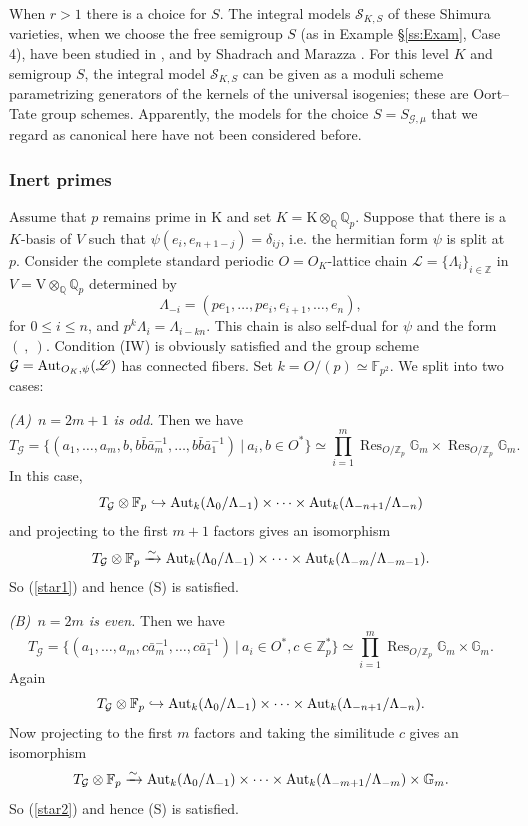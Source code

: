 \documentclass[reqno, 10pt]{amsart}
\newcommand{\BF}{\ensuremath{\mathbb {F}}\xspace}
\newcommand{\BG}{\ensuremath{\mathbb {G}}\xspace}
\newcommand{\BQ}{\ensuremath{\mathbb {Q}}\xspace}
\newcommand{\BZ}{\ensuremath{\mathbb {Z}}\xspace}
\newcommand{\CG}{\ensuremath{\mathcal {G}}\xspace}
\newcommand{\CS}{\ensuremath{\mathcal {S}}\xspace}
\newcommand{\RK}{\ensuremath{\mathrm {K}}\xspace}
\newcommand{\RV}{\ensuremath{\mathrm {V}}\xspace}
\DeclareMathOperator{\Res}{Res}
\theoremstyle{definition}
\numberwithin{equation}{subsection}
\numberwithin{subsubsection}{subsection}
\begin{document}
When $r>1$ there is a choice for $S$. The integral models $\CS_{K, S}$ of these Shimura varieties, when we choose the free semigroup $S$ (as in Example \S\ref{ss:Exam}, Case 4), have been studied  in \cite{HR}, \cite{HLS} and by  Shadrach \cite{Shadrach} and Marazza \cite{Marazza}. For this level $K$ and semigroup $S$, the integral model $\CS_{K, S}$ can be given 
as a moduli scheme parametrizing generators of the kernels of the universal isogenies; these are Oort--Tate group schemes. 
Apparently, the models for the choice $S=S_{\CG,\mu}$ that we regard as canonical here have not been considered before.

 
\subsubsection{Inert primes} Assume that $p$ remains prime in $\RK$ and set $K=\RK\otimes_\BQ\BQ_p$. Suppose that there is a $K$-basis of $V$ such that $\psi(e_i, e_{n+1-j})=\delta_{ij}$, i.e. the hermitian form $\psi$ is split at $p$. Consider the
complete standard periodic $O=O_K$-lattice chain $\mathscr L=\{\Lambda_i\}_{i\in \BZ}$ in $V=\RV\otimes_\BQ\BQ_p$ determined by
\[
\Lambda_{-i}=(pe_1,\ldots, pe_i, e_{i+1},\ldots ,e_n),
\]
for $0\leq i\leq n$, and $p^k\Lambda_i=\Lambda_{i-kn}$. This chain is also self-dual for $\psi$ and the form $(\ ,\ )$.
Condition (IW) is obviously satisfied and the group scheme $\CG={\rm Aut}_{O_K,\psi}(\mathscr L)$ has connected fibers.
Set $k=O/(p)\simeq\BF_{p^2}$.
We split into two cases:
 \medskip

\noindent\emph{(A)\ $n=2m+1$ is odd.} Then we have
\[
T_\CG=\{(a_1,\ldots, a_m, b, b\bar b\bar a_m^{-1},\ldots, b\bar b\bar a_1^{-1})\ |\ a_i, b\in O^*\}\simeq \prod_{i=1}^m \Res_{O/\BZ_p}\BG_m\times \Res_{O/\BZ_p}\BG_m.
\]
In this case,
\[
T_\CG\otimes\BF_p\hookrightarrow {\rm Aut}_{k}(\Lambda_0/\Lambda_{-1})\times\cdots \times {\rm Aut}_{k}(\Lambda_{-n+1}/\Lambda_{-n})
\]
and projecting to the first $m+1$ factors  
gives an isomorphism
\[
T_\CG\otimes\BF_p\xrightarrow{\sim} {\rm Aut}_{k}(\Lambda_0/\Lambda_{-1})\times\cdots \times {\rm Aut}_{k}(\Lambda_{-m}/\Lambda_{-m-1}).
\]
So (\ref{star1}) and hence (S) is satisfied.



\medskip

\noindent\emph{(B)\ $n=2m$ is even.} 
Then we have
\[
T_\CG=\{(a_1,\ldots, a_m, c\bar a_m^{-1},\ldots, c\bar a_1^{-1})\ |\ a_i \in O^*, c\in \BZ_p^*\}\simeq \prod_{i=1}^m \Res_{O/\BZ_p}\BG_m\times  \BG_m.
\]
Again
\[
T_\CG\otimes\BF_p\hookrightarrow {\rm Aut}_{k}(\Lambda_0/\Lambda_{-1})\times\cdots \times {\rm Aut}_{k}(\Lambda_{-n+1}/\Lambda_{-n}).
\]
Now projecting to the first $m$ factors  and taking the similitude $c$
gives an isomorphism
\[
T_\CG\otimes\BF_p\xrightarrow{\sim} {\rm Aut}_{k}(\Lambda_0/\Lambda_{-1})\times\cdots \times {\rm Aut}_{k}(\Lambda_{-m+1}/\Lambda_{-m})\times \BG_m.
\]
So (\ref{star2}) and hence (S) is satisfied.
\medskip
\end{document}
